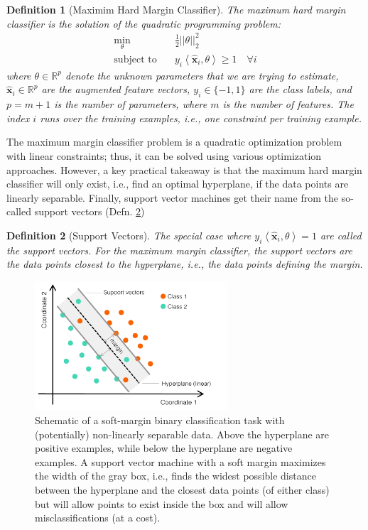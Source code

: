 \documentclass{article}[11pt]
\newtheorem{defn}{Definition}
\def\R{\mathbb{R}}
\newcommand{\norm}[1]{\left|\left|#1\right|\right|}
\begin{document}
\begin{mdframed}
\begin{defn}[Maximim Hard Margin Classifier]\label{defn:max-margin}
The maximum hard margin classifier is the solution of the quadratic programming problem:
\begin{align*}
    \min_{\theta}\quad & \frac{1}{2}\norm{\theta}_{2}^{2}\\
    \text{subject to}\quad & y_{i}\left<\hat{\mathbf{x}}_{i},\theta\right> \geq 1\quad\forall i
\end{align*}
where $\theta\in\R^{p}$ denote the unknown parameters that we are trying to estimate,
$\hat{\mathbf{x}}_{i}\in\R^{p}$ are the augmented feature vectors, $y_{i}\in\{-1,1\}$ are the class labels, and $p=m+1$ is the number of parameters, where $m$ is the number of features.
The index $i$ runs over the training examples, i.e., one constraint per training example.
\end{defn}
\end{mdframed}

The maximum margin classifier problem is a quadratic optimization problem with linear constraints; thus, it can be solved using various optimization approaches.
However, a key practical takeaway is that the maximum hard margin classifier will only exist, i.e., find an optimal hyperplane, if the data points are linearly separable.
Finally, support vector machines get their name from the so-called support vectors (Defn. \ref{defn:max-margin-support-vector})
\begin{defn}[Support Vectors]\label{defn:max-margin-support-vector}
The special case where $y_{i}\left<\hat{\mathbf{x}}_{i},\theta\right> = 1$ are called the \textit{support vectors}. 
For the maximum margin classifier, the support vectors are the data points closest to the hyperplane, i.e., the data points defining the margin.
\end{defn}

\begin{figure}
    \centering
	\includegraphics[width=0.64\textwidth]{./figs/Fig-SVM-Schematic-Softmargin.pdf}
	\caption{Schematic of a soft-margin binary classification task with (potentially) non-linearly separable data.
    Above the hyperplane are positive examples, while below the hyperplane are negative examples.
    A support vector machine with a soft margin maximizes the width of the gray box, i.e., finds the widest possible
    distance between the hyperplane and the closest data points (of either class) but will allow points to 
    exist inside the box and will allow misclassifications (at a cost).}\label{fig:linearhyperplane-svm-softmargin}
\end{figure}
\end{document}
